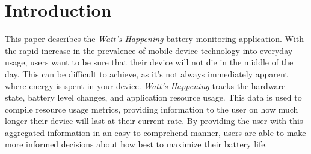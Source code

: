 \section{Introduction}
\label{sec:intro}
This paper describes the \emph{Watt's Happening} battery monitoring application. 
With the rapid increase in the prevalence of mobile device technology into everyday usage, users want to be sure that their device will not die in the middle of the day.
This can be difficult to achieve, as it's not always immediately apparent where energy is spent in your device.
\emph{Watt's Happening} tracks the hardware state, battery level changes, and application resource usage. 
This data is used to compile resource usage metrics, providing information to the user on how much longer their device will last at their current rate.
By providing the user with this aggregated information in an easy to comprehend manner, users are able to make more informed decisions about how best to maximize their battery life.
